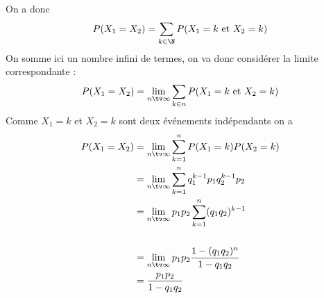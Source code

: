 \begin{correction}
\begin{enumerate}
On a donc 
$$P(X_1= X_2) = \sum_{k\in \N} P (X_1 = k \text{ et } X_2 = k)$$
On somme ici un nombre infini de termes, on va donc considérer la limite correspondante : 
$$P(X_1= X_2)  = \lim_{n\tv \infty}  \sum_{k\in n} P (X_1 = k \text{ et } X_2 = k)$$
Comme $X_1= k $ et $X_2=k$ sont deux événements indépendants on a 
\begin{align*}
P(X_1= X_2) & = \lim_{n\tv \infty}  \sum_{k= 1}^n P (X_1 = k ) P(X_2 = k)\\
					&= \lim_{n\tv \infty}  \sum_{k= 1}^nq_1^{k-1} p_1 q_2^{k-1} p_2\\
					&= \lim_{n\tv \infty}  p_1p_2\sum_{k= 1}^n (q_1q_2)^{k-1} \\\\
					&= \lim_{n\tv \infty}  p_1p_2\frac{1-(q_1q_2)^n}{1-q_1q_2} \\					
					&= \frac{p_1p_2}{1-q_1q_2} 
\end{align*}


\end{enumerate}


\end{correction}